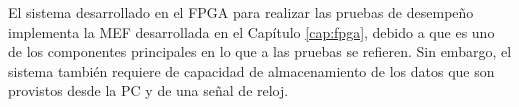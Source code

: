 
%
%
%	
%	

El sistema desarrollado en el FPGA para realizar las pruebas de desempeño implementa la MEF desarrollada en el Capítulo \ref{cap:fpga}, debido a que es uno de los componentes principales en lo que a las pruebas se refieren. Sin embargo, el sistema también requiere de capacidad de almacenamiento de los datos que son provistos desde la PC y de una señal de reloj.

